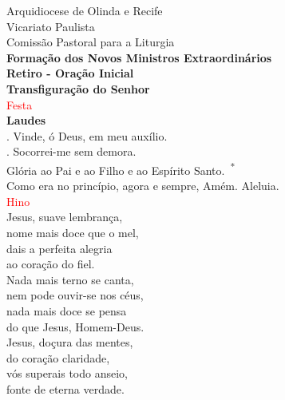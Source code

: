 \documentclass{book}
\begin{document}
\pagestyle{empty}
\begin{center}
    Arquidiocese de Olinda e Recife \\
    Vicariato Paulista \\
    Comissão Pastoral para a Liturgia
    \vspace{.2cm} \\
    \textbf{Formação dos Novos Ministros Extraordinários}
    \vspace{.2cm} \\
    \textbf{Retiro - Oração Inicial}
    \vspace{.2cm} \\
    \textbf{Transfiguração do Senhor} \\
    \textcolor{red}{Festa}
    \vspace{.2cm} \\
    \textbf{Laudes}
    \vspace{.2cm} \\
    {\color{red} \Vbar.} Vinde, ó Deus, em meu auxílio. \\
    {\color{red} \Rbar.} Socorrei-me sem demora. \\
    Glória ao Pai e ao Filho e ao Espírito Santo.\ \textsuperscript{*} \\
    Como era no princípio, agora e sempre, Amém. Aleluia.
    \vspace{.2cm} \\
    \textcolor{red}{Hino}
    \vspace{.2cm} \\
    Jesus, suave lembrança, \\
    nome mais doce que o mel, \\
    dais a perfeita alegria \\
    ao coração do fiel.
    \vspace{.2cm} \\
    Nada mais terno se canta, \\
    nem pode ouvir-se nos céus, \\
    nada mais doce se pensa \\
    do que Jesus, Homem-Deus.
    \vspace{.2cm} \\
    Jesus, doçura das mentes, \\
    do coração claridade, \\
    vós superais todo anseio, \\
    fonte de eterna verdade.
    \vspace{.2cm} \\

\end{center}
\end{document}
